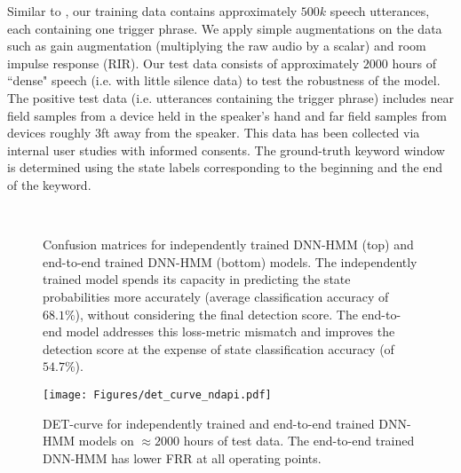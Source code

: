 \documentclass{article}
\begin{document}
Similar to \cite{Higuchi2020}, our training data contains approximately $500k$ speech utterances, each containing one trigger phrase.
We apply simple augmentations on the data such as gain augmentation (multiplying the raw audio by a scalar) and room impulse response (RIR).
Our test data consists of approximately $2000$ hours of ``dense" speech (i.e. with little silence data) to test the robustness of the model.
The positive test data (i.e. utterances containing the trigger phrase) includes near field samples from a device held in the speaker's hand and far field samples from devices roughly $3$ft away from the speaker.
This data has been collected via internal user studies with informed consents.
The ground-truth keyword window is determined using the state labels corresponding to the beginning and the end of the keyword.

\begin{figure}[h!]
  \centering
{}
\\
\vspace{-0.1in}
\vspace{-0.1in}
\caption{Confusion matrices for independently trained DNN-HMM (top) and end-to-end trained DNN-HMM (bottom) models.
The independently trained model spends its capacity in predicting the state probabilities more accurately (average classification accuracy of $68.1\%$), without considering the final detection score.
The end-to-end model addresses this loss-metric mismatch and improves the detection score at the expense of state classification accuracy (of $54.7\%$).
\vspace{-0.2in}}
\label{fig:conf_mtx}
\end{figure}

\begin{figure}[]
    \centering
    \texttt{[image: Figures/det\_curve\_ndapi.pdf]} \\
    \vspace{-0.1in}
    \caption{DET-curve for independently trained and end-to-end trained DNN-HMM models on $\approx 2000$ hours of test data.
    The end-to-end trained DNN-HMM has lower FRR at all operating points.
    \vspace{-0.1in}}
    \label{fig:det-curve}
\end{figure}
\end{document}
